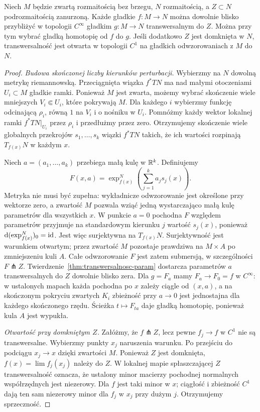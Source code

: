 \begin{twierdzenie}
\label{thm:gestosc-transwersalnych}
Niech $M$ będzie zwartą rozmaitością bez brzegu,
$N$ rozmaitością, a $Z\subset N$ podrozmaitością
zanurzoną. Każde gładkie $f:M\to N$ można
dowolnie blisko przybliżyć w topologii $C^\infty$
gładkim $g:M\to N$ transwersalnym do $Z$.
Można przy tym wybrać gładką homotopię
od $f$ do $g$.
Jeśli dodatkowo $Z$ jest domknięta w $N$,
transwersalność jest otwarta w topologii $C^1$
na gładkich odwzorowaniach z $M$ do $N$.
\end{twierdzenie}
\begin{proof}
\emph{Budowa skończonej liczby kierunków perturbacji.}
Wybierzmy na $N$ dowolną metrykę riemannowską.
Przeciągnięta wiązka $f^*TN$ ma nad małymi
otoczeniami $U_i\subset M$ gładkie ramki.
Ponieważ $M$ jest zwarta, możemy wybrać skończenie
wiele mniejszych $V_i\Subset U_i$, które pokrywają
$M$. Dla każdego $i$ wybierzmy funkcję odcinającą
$\rho_i$, równą $1$ na $V_i$ i o nośniku w $U_i$.
Pomnóżmy każdy wektor lokalnej ramki $f^*TN|_{U_i}$
przez $\rho_i$ i przedłużmy przez zero. Otrzymujemy
skończenie wiele globalnych przekrojów
$s_1,\ldots,s_k$ wiązki $f^*TN$ takich, że
ich wartości rozpinają $T_{f(x)}N$ w każdym $x$.

Niech $a=(a_1,\ldots,a_k)$ przebiega małą kulę
w $\mathbb{R}^k$. Definiujemy
\[
 F(x,a)=\exp^N_{f(x)}
              \left(\sum_{j=1}^k a_js_j(x)\right).
\]
Metryka nie musi być zupełna: wykładnicze
odwzorowanie jest określone przy wektorze zero,
a zwartość $M$ pozwala wziąć jedną wystarczająco
małą kulę parametrów dla wszystkich $x$.
W punkcie $a=0$ pochodna $F$ względem parametrów
przyjmuje na standardowym kierunku $j$ wartość
$s_j(x)$, ponieważ $\mathrm d(\exp^N_{f(x)})_0=\mathrm{id}$.
Jest więc surjektywna na $T_{f(x)}N$.
Surjektywność jest warunkiem otwartym;
przez zwartość $M$ pozostaje prawdziwa na
$M\times A$ po zmniejszeniu kuli $A$.
Całe odwzorowanie $F$ jest zatem submersją,
w szczególności $F\pitchfork Z$.
Twierdzenie~\ref{thm:transwersalnosc-param}
dostarcza parametrów $a$ transwersalnych do
$Z$ dowolnie blisko zera. Dla
$g=F_a$ mamy $F_a\to F_0=f$ w $C^\infty$:
w ustalonych mapach każda pochodna po $x$ zależy
ciągle od $(x,a)$, a na skończonym pokryciu zwartych
$K_i$ zbieżność przy $a\to0$ jest jednostajna dla każdego
skończonego rzędu. Ścieżka $t\mapsto F_{ta}$ daje
gładką homotopię, ponieważ kula $A$ jest wypukła.

\emph{Otwartość przy domkniętym $Z$.}
Załóżmy, że $f\pitchfork Z$, lecz pewne
$f_j\to f$ w $C^1$ nie są transwersalne.
Wybierzmy punkty $x_j$ naruszenia warunku.
Po przejściu do podciągu $x_j\to x$ dzięki
zwartości $M$. Ponieważ $Z$ jest domknięta,
$f(x)=\lim f_j(x_j)$ należy do $Z$.
W lokalnej mapie spłaszczającej $Z$
transwersalność oznacza, że ustalony
minor macierzy pochodnej normalnych
współrzędnych jest niezerowy. Dla $f$
jest taki minor w $x$; ciągłość i zbieżność
$C^1$ dają ten sam niezerowy minor dla
$f_j$ w $x_j$ przy dużym $j$.
Otrzymujemy sprzeczność.
\end{proof}

